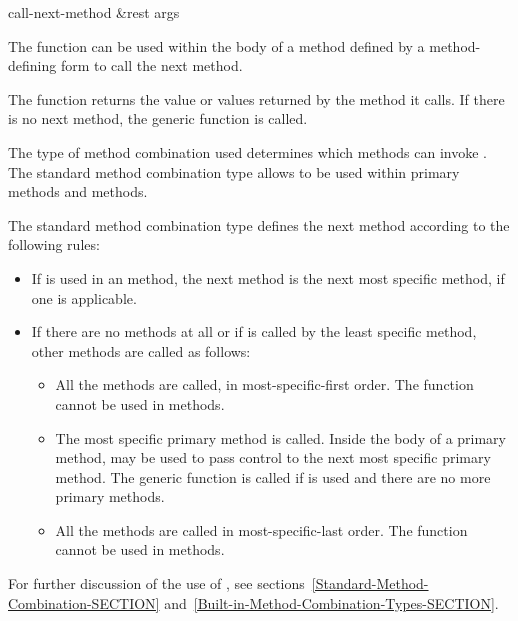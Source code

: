 \begin{defun}[Function]
call-next-method &rest args

The function  can be used within the body of a
method defined by a method-defining form to call the next method.

The function  returns the value or values
returned by the method it calls.  If there is no next method, 
the generic function  is called.

The type of method combination used determines which 
methods can invoke .  The standard method
combination type allows 
to be used within primary
methods and  methods.

The standard method combination
type defines the next method according to the following rules:

\begin{itemize}
\item 
If  is used in an  method,
the next method is the next most specific  method, if one is
applicable.

\item 
If there are no  methods at all or if 
 is called by the least specific 
method,  other methods are called as follows:

\begin{itemize}
\item  All the  methods are called, in
most-specific-first order.  The function 
cannot be used in  methods.

\item 
The most specific primary method is called.  Inside the body of a
primary method,  may be used to pass control to
the next most specific primary method.  The generic function 
 is called if  is used and there
are no more primary methods.

\item  All the  methods are called in
most-specific-last order.  The function 
cannot be used in  methods.
\end{itemize}
\end{itemize}

For further discussion of the use of , see
sections~\ref{Standard-Method-Combination-SECTION}
and~\ref{Built-in-Method-Combination-Types-SECTION}.


\end{defun}

